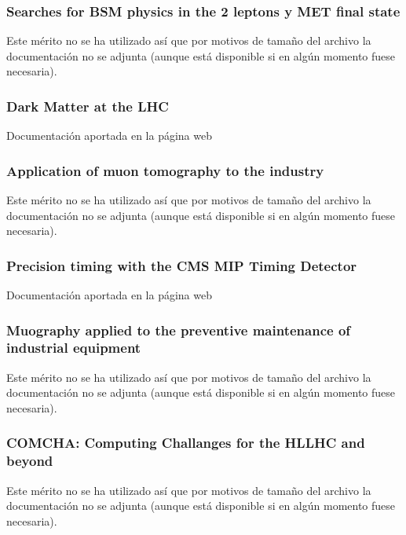 \documentclass[a4paper, 11pt, twoside, openright]{report}
\begin{document}
\subsubsection{Searches for BSM physics in the 2 leptons y MET final state}
%
Este mérito no se ha utilizado así que por motivos de tamaño del archivo la documentación no se adjunta (aunque está disponible si en algún momento fuese necesaria).

\subsubsection{Dark Matter at the LHC}
%
Documentación aportada en la página web

\subsubsection{Application of muon tomography to the industry}
%
Este mérito no se ha utilizado así que por motivos de tamaño del archivo la documentación no se adjunta (aunque está disponible si en algún momento fuese necesaria).

\subsubsection{Precision timing with the CMS MIP Timing Detector}
%
Documentación aportada en la página web

\subsubsection{Muography applied to the preventive maintenance of industrial equipment}
%
Este mérito no se ha utilizado así que por motivos de tamaño del archivo la documentación no se adjunta (aunque está disponible si en algún momento fuese necesaria).

\subsubsection{COMCHA: Computing Challanges for the HLLHC and beyond}
%
Este mérito no se ha utilizado así que por motivos de tamaño del archivo la documentación no se adjunta (aunque está disponible si en algún momento fuese necesaria).
\end{document}
